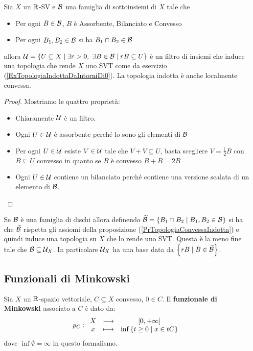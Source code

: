 \begin{proposition}[]\label{PrTopologiaConvessaIndotta}
Sia $X$ un $\mathbb{R}$-SV e $\mathcal{B}$ una famiglia di sottoinsiemi di $X$ tale che
\begin{itemize}
    \item Per ogni $B\in \mathcal{B}$, $B$ \`e Assorbente, Bilanciato e Convesso
    \item Per ogni $B_1,B_2\in\mathcal{B}$ si ha $B_1\cap B_2\in \mathcal{B}$
\end{itemize}
allora $\mathcal{U}=\left\{{U\subseteq X\mid \exists r>0,\ \exists B\in\mathcal{B}\mid rB\subseteq U}\right\}$ \`e un filtro di insiemi che induce una topologia che rende $X$ uno SVT come da esercizio (\ref{ExTopologiaIndottaDaIntorniDi0}). La topologia indotta \`e anche localmente convessa.
\end{proposition}
\begin{proof}
Mostriamo le quattro propriet\`a:
\begin{itemize}
    \item Chiaramente $\mathcal{U}$ \`e un filtro.
    \item Ogni $U\in \mathcal{U}$ \`e assorbente perch\'e lo sono gli elementi di $\mathcal{B}$
    \item Per ogni $U\in\mathcal{U}$ esiste $V\in\mathcal{U}$ tale che $V+V\subseteq U$, basta scegliere $V=\frac12 B$ con $B\subseteq U$ convesso in quanto se $B$ \`e convesso $B+B=2B$
    \item Ogni $U\in\mathcal{U}$ contiene un bilanciato perch\'e contiene una versione scalata di un elemento di $\mathcal{B}$.
\end{itemize}
\end{proof}



\begin{remark}
Se $\mathcal{B}$ \`e una famiglia di dischi allora definendo $\widetilde{\mathcal{B}}=\left\{{B_1\cap B_2\mid B_1,B_2\in\mathcal{B}}\right\}$ si ha che $\widetilde{\mathcal{B}}$ rispetta gli assiomi della proposizione (\ref{PrTopologiaConvessaIndotta}) e quindi induce una topologia su $X$ che lo rende uno SVT. Questa \`e la meno fine tale che $\mathcal{B}\subseteq \mathcal{U}_X$. In particolare $\mathcal{U}_X$ ha una base data da $\left\{{rB\mid B\in\widetilde{\mathcal{B}}}\right\}$.
\end{remark}






\subsection{Funzionali di Minkowski}
\begin{definition}
Sia $X$ un $\mathbb{R}$-spazio vettoriale, $C\subseteq X$ convesso, $0\in C$. Il \textbf{funzionale di Minkowski} associato a $C$ \`e dato da:
\[p_C:\begin{array}{ccc} {X} & \longrightarrow & {[0,+\infty]}\\ {x} & \longmapsto & {\inf\left\{{t\geq 0\mid x\in tC}\right\}} \end{array}\]
dove $\inf\emptyset=\infty$ in questo formalismo.
\end{definition}

